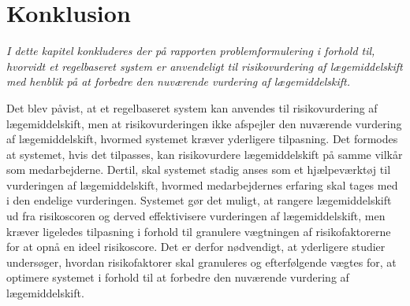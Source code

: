 \chapter{Konklusion}
\textit{I dette kapitel konkluderes der på rapporten problemformulering i forhold til, hvorvidt et regelbaseret system er anvendeligt til risikovurdering af lægemiddelskift med henblik på at forbedre den nuværende vurdering af lægemiddelskift.}

Det blev påvist, at et regelbaseret system kan anvendes til risikovurdering af lægemiddelskift, men at risikovurderingen ikke afspejler den nuværende vurdering af lægemiddelskift, hvormed systemet kræver yderligere tilpasning. 
Det formodes at systemet,  hvis det tilpasses, kan risikovurdere lægemiddelskift på samme vilkår som medarbejderne. Dertil, skal systemet stadig anses som et hjælpeværktøj til vurderingen af lægemiddelskift, hvormed medarbejdernes erfaring skal tages med i den endelige vurderingen. Systemet gør det muligt, at rangere lægemiddelskift ud fra risikoscoren og derved effektivisere vurderingen af lægemiddelskift, men kræver ligeledes tilpasning i forhold til granulere vægtningen af risikofaktorerne for at opnå en ideel risikoscore.
Det er derfor nødvendigt, at yderligere studier undersøger, hvordan risikofaktorer skal granuleres og efterfølgende vægtes for, at optimere  systemet i forhold til at forbedre den nuværende vurdering af lægemiddelskift.
